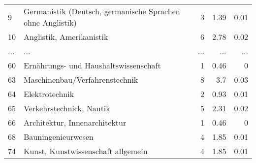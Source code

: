 \begin{longtable}{lXrrr}
        9 & \multicolumn{1}{X}{Germanistik (Deutsch, germanische Sprachen ohne Anglistik)} & %
          \num{3} &
          \num[round-mode=places,round-precision=2]{1,39} &
          \num[round-mode=places,round-precision=2]{0,01} \\
        10 & \multicolumn{1}{X}{Anglistik, Amerikanistik} & %
          \num{6} &
          \num[round-mode=places,round-precision=2]{2,78} &
          \num[round-mode=places,round-precision=2]{0,02} \\
       ... & ... & ... & ... & ... \\
        60 & \multicolumn{1}{X}{Ernährungs- und Haushaltswissenschaft} & %
          \num{1} &
          \num[round-mode=places,round-precision=2]{0,46} &
          \num[round-mode=places,round-precision=2]{0} \\

        63 & \multicolumn{1}{X}{Maschinenbau/Verfahrenstechnik} & %
          \num{8} &
          \num[round-mode=places,round-precision=2]{3,7} &
          \num[round-mode=places,round-precision=2]{0,03} \\

        64 & \multicolumn{1}{X}{Elektrotechnik} & %
          \num{2} &
          \num[round-mode=places,round-precision=2]{0,93} &
          \num[round-mode=places,round-precision=2]{0,01} \\

        65 & \multicolumn{1}{X}{Verkehrstechnick, Nautik} & %
          \num{5} &
          \num[round-mode=places,round-precision=2]{2,31} &
          \num[round-mode=places,round-precision=2]{0,02} \\

        66 & \multicolumn{1}{X}{Architektur, Innenarchitektur} & %
          \num{1} &
          \num[round-mode=places,round-precision=2]{0,46} &
          \num[round-mode=places,round-precision=2]{0} \\

        68 & \multicolumn{1}{X}{Bauningenieurwesen} & %
          \num{4} &
          \num[round-mode=places,round-precision=2]{1,85} &
          \num[round-mode=places,round-precision=2]{0,01} \\

        74 & \multicolumn{1}{X}{Kunst, Kunstwissenschaft allgemein} & %
          \num{4} &
          \num[round-mode=places,round-precision=2]{1,85} &
          \num[round-mode=places,round-precision=2]{0,01} \\


\end{longtable}
